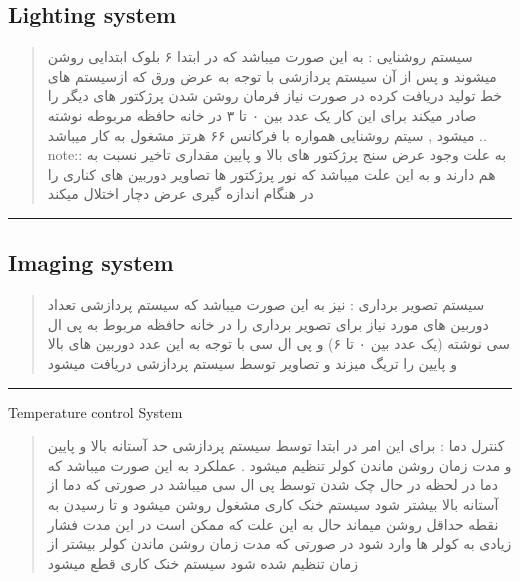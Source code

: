 \documentclass[letterpaper,10pt,english]{sphinxmanual}
\begin{document}
\subsection{Lighting system}
\label{\detokenize{Plc:lighting-system}}
\sphinxAtStartPar
\begin{quote}\begin{farsi}
سیستم روشنایی : به این صورت میباشد که در ابتدا ۶ بلوک ابتدایی روشن میشوند و  پس از آن سیستم پردازشی  با توجه به عرض ورق که ازسیستم های خط تولید دریافت کرده در صورت نیاز فرمان روشن شدن پرژکتور های دیگر را صادر میکند برای این کار یک عدد بین ۰ تا ۳ در خانه حافظه مربوطه نوشته میشود , سیتم روشنایی همواره با فرکانس ۶۶ هرتز مشغول به کار میباشد
.. note::  به علت وجود عرض سنج پرژکتور های بالا و پایین مقداری تاخیر نسبت به هم دارند و به این علت میباشد که نور پرژکتور ها تصاویر دوربین های کناری را در هنگام اندازه گیری عرض دچار اختلال میکند
\end{farsi}\end{quote}

\bigskip\hrule\bigskip



\subsection{Imaging system}
\label{\detokenize{Plc:imaging-system}}
\sphinxAtStartPar
\begin{quote}\begin{farsi}
سیستم تصویر برداری : نیز به این صورت میباشد که سیستم پردازشی تعداد دوربین های مورد نیاز برای تصویر برداری را در خانه حافظه مربوط به پی ال سی نوشته (یک عدد بین ۰ تا ۶) و پی ال سی با توجه به این عدد دوربین های بالا و پایین را تریگ میزند و تصاویر توسط سیستم پردازشی دریافت میشود
\end{farsi}\end{quote}

\bigskip\hrule\bigskip


\sphinxAtStartPar
Temperature control System

\sphinxAtStartPar
\begin{quote}\begin{farsi}
کنترل دما : برای این امر در ابتدا توسط سیستم پردازشی حد آستانه بالا و پایین و مدت زمان روشن ماندن کولر تنظیم میشود . عملکرد به این صورت میباشد که دما در لحظه در حال چک شدن توسط پی ال سی میباشد در صورتی که دما از آستانه بالا بیشتر شود سیستم خنک کاری مشغول روشن میشود و تا رسیدن به نقطه حداقل روشن میماند حال به این علت که ممکن است در این مدت فشار زیادی به کولر ها وارد شود در صورتی که مدت زمان روشن ماندن کولر بیشتر از زمان تنظیم شده شود سیستم خنک کاری قطع میشود
\end{farsi}\end{quote}
\sphinxstepscope
\end{document}
